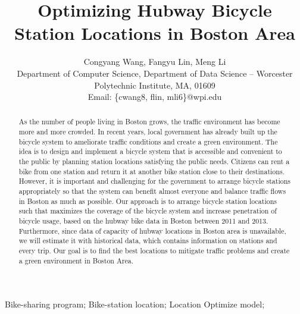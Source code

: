 \documentclass[journal, letterpaper]{IEEEtran}
\begin{document}
\title{Optimizing Hubway Bicycle Station Locations in Boston Area}
\author{Congyang Wang, Fangyu Lin, Meng Li \\ Department of Computer Science, Department of Data Science -- Worcester Polytechnic Institute, MA, 01609 \\ Email: \{cwang8, flin, mli6\}@wpi.edu}
\maketitle

\begin{abstract} 
\large As the number of people living in Boston grows, the traffic environment has become more and more crowded. In recent years, local government has already built up the bicycle system to ameliorate traffic conditions and create a green environment. The idea is to design and implement a bicycle system that is accessible and convenient to the public by planning station locations satisfying the public needs. Citizens can rent a bike from one station and return it at another bike station close to their destinations. However, it is important and challenging for the government to arrange bicycle stations appropriately so that the system can benefit almost everyone and balance traffic flows in Boston as much as possible. Our approach is to arrange bicycle station locations such that maximizes the coverage of the bicycle system and increase penetration of bicycle usage, based on the hubway bike data in Boston between 2011 and 2013. Furthermore, since data of capacity of hubway locations in Boston area is unavailable, we will estimate it with historical data, which contains information on stations and every trip. Our goal is to find the best locations to mitigate traffic problems and create a green environment in Boston Area.
\end{abstract}

\begin{IEEEkeywords}
Bike-sharing program;
Bike-station location;
Location Optimize model;
\end{IEEEkeywords}
\end{document}
